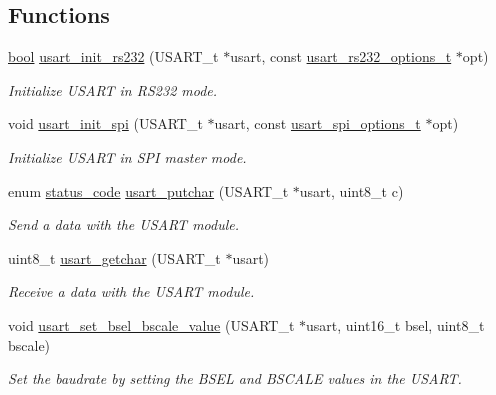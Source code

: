 \subsection*{Functions}
\begin{DoxyCompactItemize}
\item 
\hyperlink{group__group__xmega__utils_ga97a80ca1602ebf2303258971a2c938e2}{bool} \hyperlink{group__usart__group_ga507caac3c2c003461cd6ded584af984d}{usart\-\_\-init\-\_\-rs232} (U\-S\-A\-R\-T\-\_\-t $\ast$usart, const \hyperlink{group__usart__group_ga7ef7b0c900cfe5c657ed5dd41170091d}{usart\-\_\-rs232\-\_\-options\-\_\-t} $\ast$opt)
\begin{DoxyCompactList}\small\item\em Initialize U\-S\-A\-R\-T in R\-S232 mode. \end{DoxyCompactList}\item 
void \hyperlink{group__usart__group_gaa71a564aca681701dc6b28150eda0ea1}{usart\-\_\-init\-\_\-spi} (U\-S\-A\-R\-T\-\_\-t $\ast$usart, const \hyperlink{group__usart__group_gaf687857c26a3ebf13a9e63767efe9e9c}{usart\-\_\-spi\-\_\-options\-\_\-t} $\ast$opt)
\begin{DoxyCompactList}\small\item\em Initialize U\-S\-A\-R\-T in S\-P\-I master mode. \end{DoxyCompactList}\item 
enum \hyperlink{group__group__xmega__utils__status__codes_ga751c892e5a46b8e7d282085a5a5bf151}{status\-\_\-code} \hyperlink{group__usart__group_gaf3c57d5ee2bacfbc36338e64ca8107a6}{usart\-\_\-putchar} (U\-S\-A\-R\-T\-\_\-t $\ast$usart, uint8\-\_\-t c)
\begin{DoxyCompactList}\small\item\em Send a data with the U\-S\-A\-R\-T module. \end{DoxyCompactList}\item 
uint8\-\_\-t \hyperlink{group__usart__group_ga194074a7bb28e694e22b604a5df7508f}{usart\-\_\-getchar} (U\-S\-A\-R\-T\-\_\-t $\ast$usart)
\begin{DoxyCompactList}\small\item\em Receive a data with the U\-S\-A\-R\-T module. \end{DoxyCompactList}\item 
void \hyperlink{group__usart__group_gad76d1ebafabf97ace1b4fabf3b95bad5}{usart\-\_\-set\-\_\-bsel\-\_\-bscale\-\_\-value} (U\-S\-A\-R\-T\-\_\-t $\ast$usart, uint16\-\_\-t bsel, uint8\-\_\-t bscale)
\begin{DoxyCompactList}\small\item\em Set the baudrate by setting the B\-S\-E\-L and B\-S\-C\-A\-L\-E values in the U\-S\-A\-R\-T. \end{DoxyCompactList}\item 

\end{DoxyCompactItemize}
